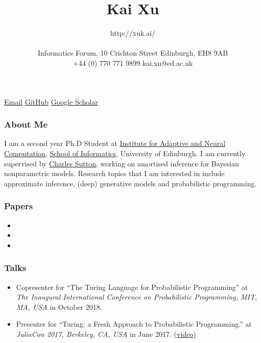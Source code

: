 \documentclass[11pt, a4paper]{article}
\title{Kai Xu} %
\date{} %
\author{http://xuk.ai/\\\\
Informatics Forum, 10 Crichton Street \textbar{} Edinburgh, EH8 9AB\\ %
+44 (0) 770 771 9899 \textbar{} kai.xu@ed.ac.uk } %
\providecommand{\tightlist}{%
  \setlength{\itemsep}{0pt}\setlength{\parskip}{0pt}}
\begin{document}

\maketitle
\begin{raggedright}
\href{mailto:kai.xu@ed.ac.uk}{Email} \textbar{}
\href{http://github.com/xukai92}{GitHub} \textbar{}
\href{https://scholar.google.ca/citations?user=kf3C60wAAAAJ}{Google
Scholar}

\subsubsection{About Me}

I am a second year Ph.D Student at
\href{http://www.anc.ed.ac.uk/}{Institute for Adaptive and Neural
Computation}, \href{https://www.ed.ac.uk/informatics}{School of
Informatics}, University of Edinburgh. I am currently supervised by
\href{http://homepages.inf.ed.ac.uk/csutton/}{Charles Sutton}, working
on amortised inference for Bayesian nonparametric models. Research
topics that I am interested in include approximate inference, (deep)
generative models and probabilistic programming.

\subsubsection{Papers}

\begin{itemize}
\item
\item
\item
\end{itemize}

\subsubsection{Talks}

\begin{itemize}
\tightlist
\item
  Copresenter for ``The Turing Language for Probabilistic Programming''
  at \emph{The Inaugural International Conference on Probabilistic
  Programming, MIT, MA, USA} in October 2018.
\item
  Presenter for ``Turing: a Fresh Approach to Probabilistic
  Programming.'' at \emph{JuliaCon 2017, Berkeley, CA, USA} in June
  2017. (\href{https://www.youtube.com/watch?v=DJWNQg7uuCg}{video})
\end{itemize}


\end{raggedright}
\end{document}
